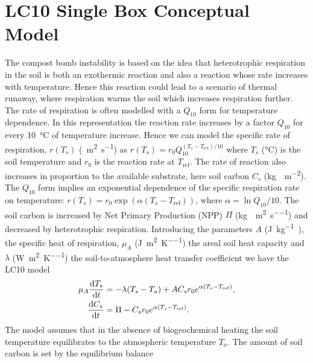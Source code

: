 \section{LC10 Single Box Conceptual Model}
\label{sec:lc10}
The compost bomb instability is based on the idea that heterotrophic respiration in the soil is both an exothermic reaction\cite{Thornley1971} and
also a reaction whose rate increases with temperature. Hence this reaction could lead to a scenario of thermal runaway, where respiration warms the soil which increases respiration further.
The rate of respiration is often modelled with a $Q_{10}$ form\cite{Kirschbaum1995} for temperature dependence.
In this representation the reaction rate increases by a factor $Q_{10}$
for every \SI{10}{\degreeCelsius} of temperature increase.
Hence we can model the specific rate of respiration, $r(T_s)$ (\si{\per\square\meter\per\second}) as $r(T_s) = r_0 Q_{10}^{\left(T_s - T_{\mathrm{ref}}\right)/10}$
where $T_s$ (\si{\degreeCelsius}) is the soil temperature and $r_0$ is the reaction rate at
$T_{\mathrm{ref}}$. The rate of reaction also increases in proportion to the available substrate, here soil carbon $C_s$ (\si{\kilo\gram\carbon\per\square\meter}).
The $Q_{10}$ form implies an exponential dependence of the specific respiration rate on temperature:  $r(T_s)=r_0 \exp\left(\alpha\left(T_s-T_{\mathrm{ref}}\right)\right)$, where
$\alpha = \ln Q_{10}/10$. The soil carbon is increased by Net Primary Production (NPP)
$\Pi$ (\si{\kilo\gram\carbon\per\square\meter\per\second}) and decreased by heterotrophic respiration. Introducing the parameters $A$ (\si{\joule\per\kilo\gram\carbon}), the specific heat
of respiration, $\mu_A$ (\si{\joule\per\square\meter\per\kelvin}) the areal soil heat capacity and $\lambda$ (\si{\watt\per\square\meter\per\kelvin})
the soil-to-atmosphere heat transfer coefficient we have the LC10 model
\begin{subequations}

  \label{eq:lc10}
 \begin{align}
   \mu_A\dv{T_s}{t} &= -\lambda (T_s - T_a) + AC_sr_0e^{\alpha (T_s - T_{\mathrm{ref}})}, \label{subeq:lc10_temperature}\\
  \dv{C_s}{t} &= \Pi - C_sr_0e^{\alpha (T_s - T_{\mathrm{ref}})}.  \label{subeq:lc10_soil_carbon}
 \end{align}
\end{subequations}
The model assumes that in the absence of biogeochemical heating the soil temperature equilibrates to the atmospheric temperature $T_a$. The amount of soil carbon is set by the equilibrium balance
